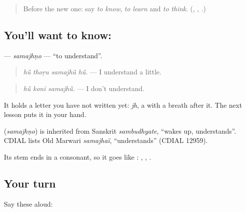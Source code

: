\label{lesson:MW-C157-samajhno}



\begin{quote}
Before the new one: say \emph{to know}, \emph{to learn} and \emph{to think}. (\textbf{}, \textbf{}, \textbf{}.)
\end{quote}

\subsection*{You'll want to know: }
\textbf{} — \emph{samajhṇo} — \textquotedblleft{}to understand\textquotedblright{}.

\begin{quote}
\textbf{   }
\end{quote}

\begin{quote}
\emph{hū̃ thoṛu samajhū̃ hū̃.} — I understand a little.
\end{quote}

\begin{quote}
\textbf{  }
\end{quote}

\begin{quote}
\emph{hū̃ konī samajhū̃.} — I don't understand.
\end{quote}

It holds a letter you have not written yet: \emph{jh}, a \textbf{} with a breath after it. The next lesson puts it in your hand.

\begin{cousinweb}
\textbf{} (\emph{samajhṇo}) is inherited from Sanskrit \emph{sambudhyate}, \textquotedblleft{}wakes up, understands\textquotedblright{}. CDIAL lists Old Marwari \emph{samajhaï}, \textquotedblleft{}understands\textquotedblright{} (CDIAL 12959).
\end{cousinweb}

\begin{grammarlens}[title={What you've built}]
Its stem \textbf{} ends in a consonant, so it goes like \textbf{}: \textbf{ }, \textbf{ }, \textbf{ }.
\end{grammarlens}

\subsection*{Your turn}
Say these aloud:

